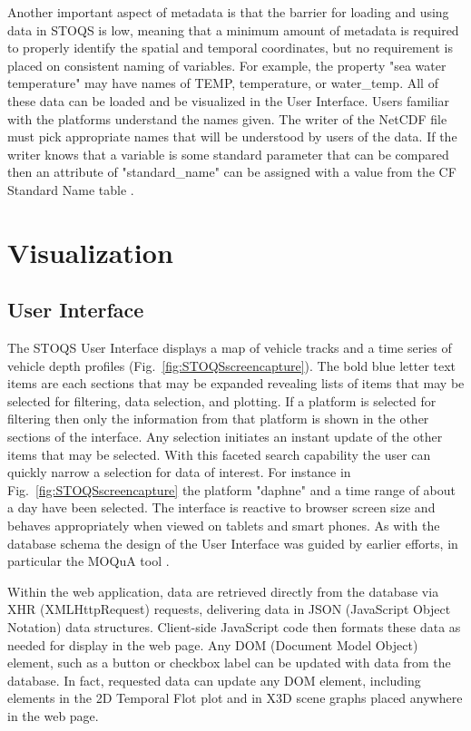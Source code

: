 \documentclass[conference]{IEEEtran}
\begin{document}
Another important aspect of metadata is that the barrier for loading and using data in STOQS is low, meaning that a minimum amount of metadata is required to properly identify the spatial and temporal coordinates, but no requirement is placed on consistent naming of variables. For example, the property "sea water temperature" may have names of TEMP, temperature, or water\_temp. All of these data can be loaded and be visualized in the User Interface. Users familiar with the platforms understand the names given. The writer of the NetCDF file must pick appropriate names that will be understood by users of the data. If the writer knows that a variable is some standard parameter that can be compared then an attribute of "standard\_name" can be assigned with a value from the CF Standard Name table \cite{CFSN}. 


\section{Visualization}

\subsection{User Interface}

The STOQS User Interface displays a map of vehicle tracks and a time series of vehicle depth profiles (Fig.~\ref{fig:STOQSscreencapture}). The bold blue letter text items are each sections that may be expanded revealing lists of items that may be selected for filtering, data selection, and plotting. If a platform is selected for filtering then only the information from that platform is shown in the other sections of the interface. Any selection initiates an instant update of the other items that may be selected. With this faceted search capability the user can quickly narrow a selection for data of interest. For instance in Fig.~\ref{fig:STOQSscreencapture} the platform "daphne"  and a time range of about a day have been selected. The interface is reactive to browser screen size and behaves appropriately when viewed on tablets and smart phones. As with the database schema the design of the User Interface was guided by earlier efforts, in particular the MOQuA tool \cite{godin05}.

Within the web application, data are retrieved directly from the database via XHR (XMLHttpRequest) requests, delivering data in JSON (JavaScript Object Notation) data structures. Client-side JavaScript code then formats these data as needed for display in the web page. Any DOM (Document Model Object) element, such as a button or checkbox label can be updated with data from the database. In fact, requested data can update any DOM element, including elements in the 2D Temporal Flot plot and in X3D scene graphs placed anywhere in the web page.
\end{document}
